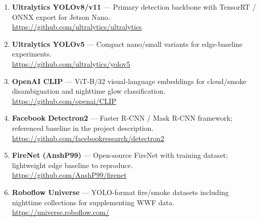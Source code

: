 \documentclass[11pt,twocolumn]{article}
\begin{document}
\begin{enumerate}[leftmargin=*, itemsep=4pt]

    \item \textbf{Ultralytics YOLOv8/v11} --- Primary detection backbone
          with TensorRT / ONNX export for Jetson Nano.\\
          \url{https://github.com/ultralytics/ultralytics}

    \item \textbf{Ultralytics YOLOv5} --- Compact nano/small variants
          for edge-baseline experiments.\\
          \url{https://github.com/ultralytics/yolov5}

    \item \textbf{OpenAI CLIP} --- ViT-B/32 visual-language embeddings
          for cloud/smoke disambiguation and nighttime glow
          classification.\\
          \url{https://github.com/openai/CLIP}

    \item \textbf{Facebook Detectron2} --- Faster R-CNN / Mask R-CNN
          framework; referenced baseline in the project description.\\
          \url{https://github.com/facebookresearch/detectron2}

    \item \textbf{FireNet (AnshP99)} --- Open-source FireNet with
          training dataset; lightweight edge baseline to reproduce.\\
          \url{https://github.com/AnshP99/firenet}

    \item \textbf{Roboflow Universe} --- YOLO-format fire/smoke datasets
          including nighttime collections for supplementing WWF data.\\
          \url{https://universe.roboflow.com/}

\end{enumerate}
\end{document}

